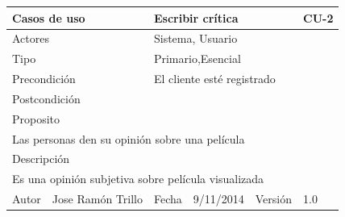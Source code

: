 \documentclass{article}
\begin{document}
\clearpage
\begin{table}[h]
\begin{tabular}{|l|l|l|l|l|l|}
\hline
\multicolumn{2}{|p{2cm}|}{Casos de uso}  & \multicolumn{3}{p{7cm}|}{\textbf{Escribir crítica}} & CU-2 \\
\hline
\multicolumn{2}{|p{2cm}|}{Actores}       & \multicolumn{4}{p{8cm}|}{Sistema, Usuario}        \\
\hline
\multicolumn{2}{|p{2cm}|}{Tipo}          & \multicolumn{4}{p{8cm}|}{Primario,Esencial}        \\
\hline
\multicolumn{2}{|p{2cm}|}{Precondición}  & \multicolumn{4}{p{8cm}|}{El cliente esté registrado}        \\
\hline
\multicolumn{2}{|p{2cm}|}{Postcondición} & \multicolumn{4}{p{8cm}|}{}        \\
\hline
\multicolumn{6}{|p{10cm}|}{Proposito}                                   \\
\hline
\multicolumn{6}{|p{10cm}|}{Las personas den su opinión sobre una película}                                            \\
\hline
\multicolumn{6}{|p{10cm}|}{Descripción}                                 \\
\hline
\multicolumn{6}{|p{10cm}|}{Es una opinión subjetiva sobre película visualizada}                                            \\
\hline
Autor              &      Jose Ramón Trillo        & Fecha    & 9/11/2014    &   Versión  &1.0\\
\hline
\end{tabular}
\end{table}
\end{document}
